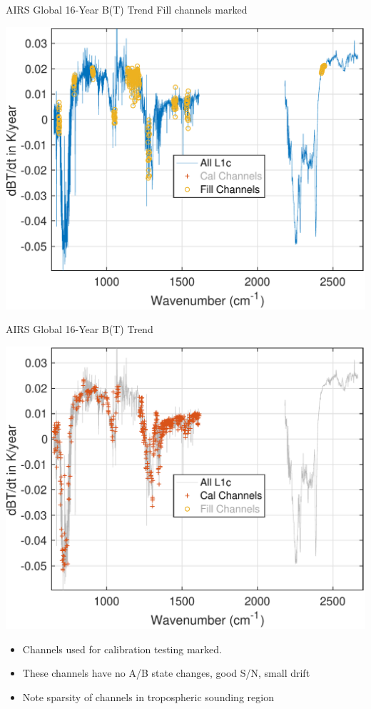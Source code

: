 \documentclass[10pt,t]{beamer}
\begin{document}
\begin{frame}[label={sec:orgb8e9e0a}]{AIRS Global 16-Year B(T) Trend}
Fill channels marked

\begin{center}
\includegraphics[width=0.85\linewidth]{./Figs/Pdf/rand_global_trend_l1c_overview_fill_marked.pdf}
\end{center}
\end{frame}

\begin{frame}[label={sec:org2f79bbd}]{AIRS Global 16-Year B(T) Trend}
\vspace{-0.1in}

\begin{center}
\includegraphics[width=0.75\linewidth]{./Figs/Pdf/rand_global_trend_l1c_overview_calfit_marked.pdf}
\end{center}

\vspace{-0.15in}
\begin{footnotesize}
\begin{itemize}
\item Channels used for calibration testing marked.
\item These channels have no A/B state changes, good S/N, small drift
\item Note sparsity of \cd channels in tropospheric sounding region
\end{itemize}
\end{footnotesize}
\end{frame}
\end{document}
